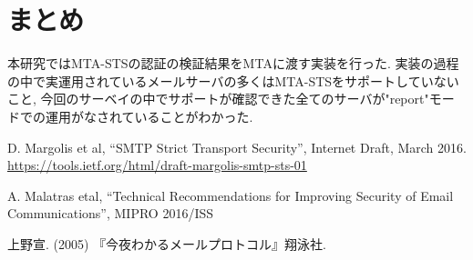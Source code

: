 \documentclass[a4j, 10pt, uplatex]{jsarticle}
\begin{document}
\section{まとめ}

本研究ではMTA-STSの認証の検証結果をMTAに渡す実装を行った. 実装の過程の中で実運用されているメールサーバの多くはMTA-STSをサポートしていないこと, 今回のサーベイの中でサポートが確認できた全てのサーバが"report"モードでの運用がなされていることがわかった.



\begin{thebibliography}{9}
D. Margolis et al,  “SMTP Strict Transport Security”,  Internet Draft,  March 2016.\\
\url{https://tools.ietf.org/html/draft-margolis-smtp-sts-01}

A. Malatras etal,  “Technical Recommendations for Improving Security of Email Communications”,  MIPRO 2016/ISS

上野宣. (2005) 『今夜わかるメールプロトコル』翔泳社.

\end{thebibliography}
\end{document}
